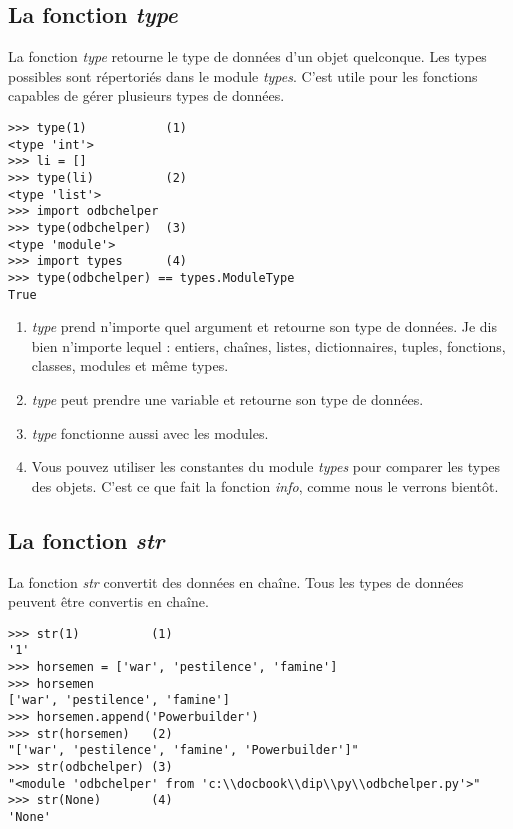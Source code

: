 \subsection{La fonction \emph{type}}

La fonction \emph{type} retourne le type de données d’un objet quelconque. Les types possibles sont répertoriés dans le module \emph{types}. C’est utile pour les fonctions capables de gérer plusieurs types de données.

\begin{example}
\begin{lstlisting}
>>> type(1)           (1)
<type 'int'>
>>> li = []
>>> type(li)          (2)
<type 'list'>
>>> import odbchelper
>>> type(odbchelper)  (3)
<type 'module'>
>>> import types      (4)
>>> type(odbchelper) == types.ModuleType
True
\end{lstlisting}
\end{example}

\begin{enumerate}
    \item{\emph{type} prend n’importe quel argument et retourne son type de données. Je dis bien n’importe lequel : entiers, chaînes, listes, dictionnaires, tuples, fonctions,  classes, modules et même types.}
    \item{\emph{type} peut prendre une variable et retourne son type de données.}
    \item{\emph{type} fonctionne aussi avec les modules.}
    \item{Vous pouvez utiliser les constantes du module \emph{types} pour comparer les types des objets. C’est ce que fait la fonction \emph{info}, comme nous le verrons bientôt.}
\end{enumerate}

\subsection{La fonction \emph{str}}

La fonction \emph{str} convertit des données en chaîne. Tous les types de données peuvent être convertis en chaîne.

\begin{example}
\begin{lstlisting}
>>> str(1)          (1)
'1'
>>> horsemen = ['war', 'pestilence', 'famine']
>>> horsemen
['war', 'pestilence', 'famine']
>>> horsemen.append('Powerbuilder')
>>> str(horsemen)   (2)
"['war', 'pestilence', 'famine', 'Powerbuilder']"
>>> str(odbchelper) (3)
"<module 'odbchelper' from 'c:\\docbook\\dip\\py\\odbchelper.py'>"
>>> str(None)       (4)
'None'
\end{lstlisting}
\end{example}

